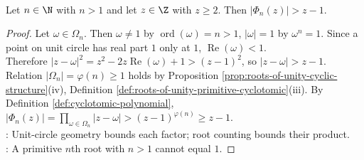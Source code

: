 \begin{lemma} \label{lem:cyclotomic-size-estimate-for-wedderburn} \\
Let $n\in\N$ with $n>1$ and let $z\in\Z$ with $z\geq2$. Then $|\Phi_n(z)|>z-1$.
\begin{proof}
Let $\omega\in\Omega_n$. Then $\omega\neq1$ by $\operatorname{ord}(\omega)=n>1$, $|\omega|=1$ by $\omega^n=1$. Since a point on unit circle has real part $1$ only at $1$, $\operatorname{Re}(\omega)<1$.\\
Therefore $|z-\omega|^2=z^2-2z\operatorname{Re}(\omega)+1>(z-1)^2$, so $|z-\omega|>z-1$. Relation $|\Omega_n|=\varphi(n)\geq1$ holds by Proposition \ref{prop:roots-of-unity-cyclic-structure}(iv), Definition \ref{def:roots-of-unity-primitive-cyclotomic}(iii). By Definition \ref{def:cyclotomic-polynomial}, $|\Phi_n(z)|=\prod\limits_{\omega\in\Omega_n}|z-\omega|>(z-1)^{\varphi(n)}\geq z-1$.\\
: Unit-circle geometry bounds each factor; root counting bounds their product.\\
: A primitive $n$th root with $n>1$ cannot equal $1$.
\end{proof}
\end{lemma}
